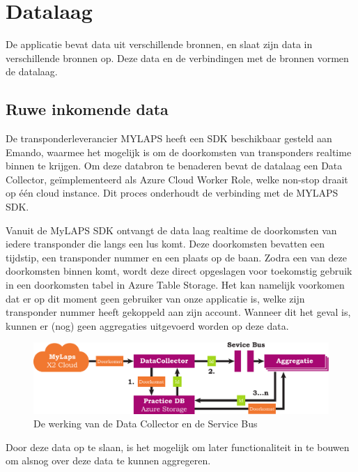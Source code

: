 \section{Datalaag}
De applicatie bevat data uit verschillende bronnen, en slaat zijn data in verschillende bronnen op. Deze data en de verbindingen met de bronnen vormen de datalaag.

\subsection{Ruwe inkomende data}

De transponderleverancier MYLAPS heeft een SDK beschikbaar gesteld aan Emando, waarmee het mogelijk is om de doorkomsten van transponders realtime binnen te krijgen. Om deze databron te benaderen bevat de datalaag een Data Collector, geïmplementeerd als Azure Cloud Worker Role, welke non-stop draait op één cloud instance. Dit proces onderhoudt de verbinding met de MYLAPS SDK.

Vanuit de MyLAPS SDK ontvangt de data laag realtime de doorkomsten van iedere transponder die langs een lus komt. Deze doorkomsten bevatten een tijdstip, een transponder nummer en een plaats op de baan. Zodra een van deze doorkomsten binnen komt, wordt deze direct opgeslagen voor toekomstig gebruik in een doorkomsten tabel in Azure Table Storage. Het kan namelijk voorkomen dat er op dit moment geen gebruiker van onze applicatie is, welke zijn transponder nummer heeft gekoppeld aan zijn account. Wanneer dit het geval is, kunnen er (nog) geen aggregaties uitgevoerd worden op deze data.

\begin{figure}[ht]
  \begin{center}
  \includegraphics[width=\textwidth]{style/images/datacollector-flow}    
  \end{center}
  \caption{De werking van de Data Collector en de Service Bus}
  \label{fig:datacollector}
\end{figure}

Door deze data op te slaan, is het mogelijk om later functionaliteit in te bouwen om alsnog over deze data te kunnen aggregeren.

